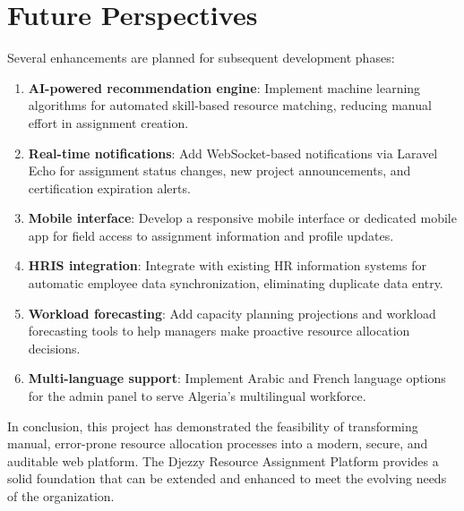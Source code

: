 \documentclass{bts-report}
\begin{document}
\section{Future Perspectives}
Several enhancements are planned for subsequent development phases:
\begin{enumerate}
  \item \textbf{AI-powered recommendation engine}: Implement machine learning algorithms for automated skill-based resource matching, reducing manual effort in assignment creation.
  \item \textbf{Real-time notifications}: Add WebSocket-based notifications via Laravel Echo for assignment status changes, new project announcements, and certification expiration alerts.
  \item \textbf{Mobile interface}: Develop a responsive mobile interface or dedicated mobile app for field access to assignment information and profile updates.
  \item \textbf{HRIS integration}: Integrate with existing HR information systems for automatic employee data synchronization, eliminating duplicate data entry.
  \item \textbf{Workload forecasting}: Add capacity planning projections and workload forecasting tools to help managers make proactive resource allocation decisions.
  \item \textbf{Multi-language support}: Implement Arabic and French language options for the admin panel to serve Algeria's multilingual workforce.
\end{enumerate}

In conclusion, this project has demonstrated the feasibility of transforming manual, error-prone resource allocation processes into a modern, secure, and auditable web platform. The Djezzy Resource Assignment Platform provides a solid foundation that can be extended and enhanced to meet the evolving needs of the organization.

\bibliographysection
\end{document}
